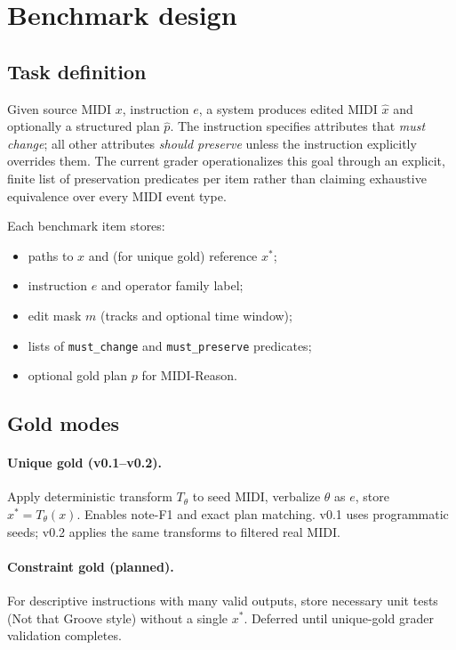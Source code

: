 \section{Benchmark design}

\subsection{Task definition}

Given source MIDI $x$, instruction $e$, a system produces edited MIDI $\hat{x}$ and optionally a structured plan $\hat{p}$. The instruction specifies attributes that \emph{must change}; all other attributes \emph{should preserve} unless the instruction explicitly overrides them. The current grader operationalizes this goal through an explicit, finite list of preservation predicates per item rather than claiming exhaustive equivalence over every MIDI event type.

Each benchmark item stores:
\begin{itemize}[leftmargin=*]
\item paths to $x$ and (for unique gold) reference $x^{*}$;
\item instruction $e$ and operator family label;
\item edit mask $m$ (tracks and optional time window);
\item lists of \texttt{must\_change} and \texttt{must\_preserve} predicates;
\item optional gold plan $p$ for MIDI-Reason.
\end{itemize}

\subsection{Gold modes}

\paragraph{Unique gold (v0.1--v0.2).}
Apply deterministic transform $T_\theta$ to seed MIDI, verbalize $\theta$ as $e$, store $x^{*} = T_\theta(x)$. Enables note-F1 and exact plan matching. v0.1 uses programmatic seeds; v0.2 applies the same transforms to filtered real MIDI.

\paragraph{Constraint gold (planned).}
For descriptive instructions with many valid outputs, store necessary unit tests (Not that Groove style) without a single $x^{*}$. Deferred until unique-gold grader validation completes.


